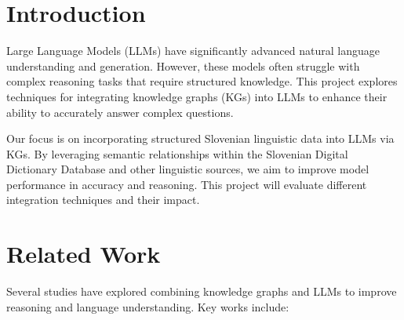 \documentclass[fleqn,moreauthors,10pt]{ds_report}
\affiliation{\textit{Advisor: Slavko Žitnik}}
\begin{document}
\flushbottom

\maketitle

\thispagestyle{empty}


\section*{Introduction}
Large Language Models (LLMs) have significantly advanced natural language understanding and generation. However, these models often struggle with complex reasoning tasks that require structured knowledge. This project explores techniques for integrating knowledge graphs (KGs) into LLMs to enhance their ability to accurately answer complex questions.

Our focus is on incorporating structured Slovenian linguistic data into LLMs via KGs. By leveraging semantic relationships within the Slovenian Digital Dictionary Database and other linguistic sources, we aim to improve model performance in accuracy and reasoning. This project will evaluate different integration techniques and their impact.

\section*{Related Work}
Several studies have explored combining knowledge graphs and LLMs to improve reasoning and language understanding. Key works include:
\end{document}
